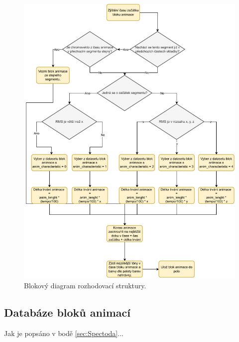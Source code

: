 \begin{figure}[H]
    \centering
    \includegraphics[width = 1\linewidth]{obrazky/Logical_structure_diagram.pdf}
    \caption{Blokový diagram rozhodovací struktury.}
    \label{fig:Logical_structure_diagram}
\end{figure}



\subsection{Databáze bloků animací} \label{sec:Database_structure}
Jak je popsáno v bodě \ref{sec:Spectoda}...

